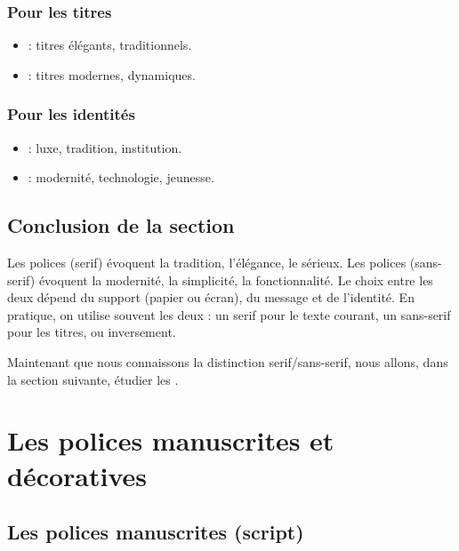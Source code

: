 \subsubsection{Pour les titres}

\begin{itemize}
    \item {} : titres élégants, traditionnels.
    \item {} : titres modernes, dynamiques.
\end{itemize}

\subsubsection{Pour les identités}

\begin{itemize}
    \item {} : luxe, tradition, institution.
    \item {} : modernité, technologie, jeunesse.
\end{itemize}

\subsection*{Conclusion de la section}

\begin{retenir}
Les polices  (serif) évoquent la tradition, l'élégance, le sérieux. Les polices  (sans-serif) évoquent la modernité, la simplicité, la fonctionnalité. Le choix entre les deux dépend du support (papier ou écran), du message et de l'identité. En pratique, on utilise souvent les deux : un serif pour le texte courant, un sans-serif pour les titres, ou inversement.
\end{retenir}

Maintenant que nous connaissons la distinction serif/sans-serif, nous allons, dans la section suivante, étudier les .

\section{Les polices manuscrites et décoratives}

\subsection{Les polices manuscrites (script)}

